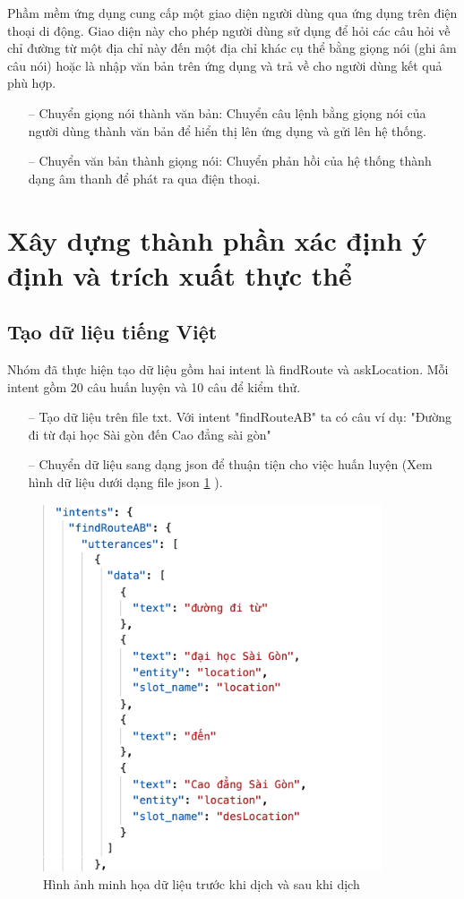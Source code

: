 Phầm mềm ứng dụng cung cấp một giao diện người dùng qua ứng dụng trên điện thoại di động. Giao diện này cho phép người dùng sử dụng để hỏi các câu hỏi về chỉ đường từ một địa chỉ này đến một địa chỉ khác cụ thể bằng giọng nói (ghi âm câu nói) hoặc là nhập văn bản trên ứng dụng và trả về cho người dùng kết quả phù hợp.
\begin{itemize}
    \item[--] Chuyển giọng nói thành văn bản: Chuyển câu lệnh bằng giọng nói của người dùng thành văn bản để hiển thị lên ứng dụng và gửi lên hệ thống.
    \item[--] Chuyển văn bản thành giọng nói: Chuyển phản hồi của hệ thống thành dạng âm thanh để phát ra qua điện thoại.
\end{itemize}

\section{Xây dựng thành phần xác định ý định và trích xuất thực thể}
\subsection{Tạo dữ liệu tiếng Việt}
Nhóm đã thực hiện tạo dữ liệu gồm hai intent là findRoute và askLocation. Mỗi intent gồm 20 câu huấn luyện và 10 câu để kiểm thử.
\begin{itemize}
    \item[--] Tạo dữ liệu trên file txt. Với intent "findRouteAB" ta có câu ví dụ: "Đường đi từ đại học Sài gòn đến Cao đẳng sài gòn"
    \item[--] Chuyển dữ liệu sang dạng json để thuận tiện cho việc huấn luyện (Xem hình dữ liệu dưới dạng file json \ref{fig:data-train-json} ).
\end{itemize}
\begin{figure}[htp]
    \centering
    \includegraphics[width=10cm]{images/Data-train-json.png}
    \caption{Hình ảnh minh họa dữ liệu trước khi dịch và sau khi dịch}
    \label{fig:data-train-json}
\end{figure}

